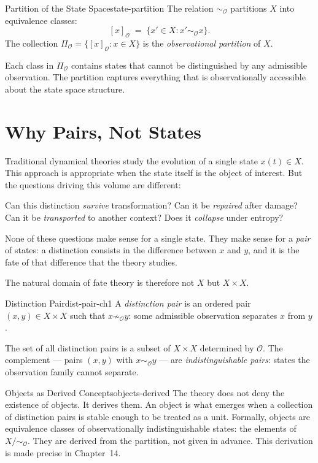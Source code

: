 \documentclass[12pt,twoside,openright]{book}
\newcommand{\distPairs}{X\times X}
\newcommand{\obs}{\mathcal{O}}
\providecommand{\partitionObs}{\Pi_{\obs}}
\providecommand{\quotientObs}{X/{\sim_{\obs}}}
\begin{document}
\begin{corollary}{Partition of the State Space}{state-partition}
The relation $\sim_\obs$ partitions $X$ into equivalence classes:
\[
  [x]_\obs \;=\; \{x'\in X : x'\sim_\obs x\}.
\]
The collection $\partitionObs = \{[x]_\obs : x\in X\}$ is the
\emph{observational partition} of $X$.
\end{corollary}

Each class in $\partitionObs$ contains states that cannot be
distinguished by any admissible observation. The partition
captures everything that is observationally accessible about
the state space structure.

\section{Why Pairs, Not States}

Traditional dynamical theories study the evolution of a single
state $x(t)\in X$. This approach is appropriate when the state
itself is the object of interest. But the questions driving
this volume are different:

Can this distinction \emph{survive} transformation?
Can it be \emph{repaired} after damage?
Can it be \emph{transported} to another context?
Does it \emph{collapse} under entropy?

None of these questions make sense for a single state. They
make sense for a \emph{pair} of states: a distinction consists
in the difference between $x$ and $y$, and it is the fate of
that difference that the theory studies.

The natural domain of fate theory is therefore not $X$ but
$\distPairs$.

\begin{definition}{Distinction Pair}{dist-pair-ch1}
A \emph{distinction pair} is an ordered pair
$(x,y)\in\distPairs$ such that $x\not\sim_\obs y$: some
admissible observation separates $x$ from $y$.
\end{definition}

The set of all distinction pairs is a subset of $\distPairs$
determined by $\obs$. The complement --- pairs $(x,y)$ with
$x\sim_\obs y$ --- are \emph{indistinguishable pairs}: states
the observation family cannot separate.

\begin{remark}{Objects as Derived Concepts}{objects-derived}
The theory does not deny the existence of objects. It derives
them. An object is what emerges when a collection of distinction
pairs is stable enough to be treated as a unit. Formally,
objects are equivalence classes of observationally
indistinguishable states: the elements of $\quotientObs$.
They are derived from the partition, not given in advance. This
derivation is made precise in Chapter~14.
\end{remark}
\end{document}
